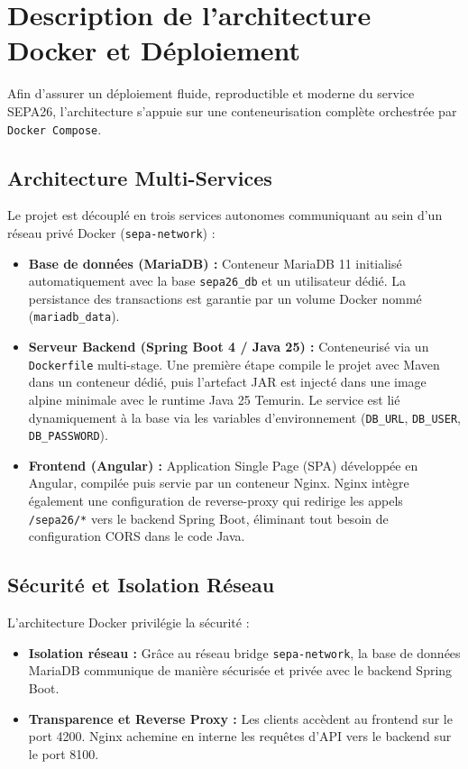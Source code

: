 \documentclass[12pt,a4paper]{article}
\begin{document}
\section{Description de l'architecture Docker et Déploiement}

Afin d'assurer un déploiement fluide, reproductible et moderne du service SEPA26, l'architecture s'appuie sur une conteneurisation complète orchestrée par \texttt{Docker Compose}.

\subsection{Architecture Multi-Services}
Le projet est découplé en trois services autonomes communiquant au sein d'un réseau privé Docker (\texttt{sepa-network}) :

\begin{itemize}
    \item \textbf{Base de données (MariaDB) :} Conteneur MariaDB 11 initialisé automatiquement avec la base \texttt{sepa26\_db} et un utilisateur dédié. La persistance des transactions est garantie par un volume Docker nommé (\texttt{mariadb\_data}).
    \item \textbf{Serveur Backend (Spring Boot 4 / Java 25) :} Conteneurisé via un \texttt{Dockerfile} multi-stage. Une première étape compile le projet avec Maven dans un conteneur dédié, puis l'artefact JAR est injecté dans une image alpine minimale avec le runtime Java 25 Temurin. Le service est lié dynamiquement à la base via les variables d'environnement (\texttt{DB\_URL}, \texttt{DB\_USER}, \texttt{DB\_PASSWORD}).
    \item \textbf{Frontend (Angular) :} Application Single Page (SPA) développée en Angular, compilée puis servie par un conteneur Nginx. Nginx intègre également une configuration de reverse-proxy qui redirige les appels \texttt{/sepa26/*} vers le backend Spring Boot, éliminant tout besoin de configuration CORS dans le code Java.
\end{itemize}

\subsection{Sécurité et Isolation Réseau}
L'architecture Docker privilégie la sécurité :
\begin{itemize}
    \item \textbf{Isolation réseau :} Grâce au réseau bridge \texttt{sepa-network}, la base de données MariaDB communique de manière sécurisée et privée avec le backend Spring Boot.
    \item \textbf{Transparence et Reverse Proxy :} Les clients accèdent au frontend sur le port 4200. Nginx achemine en interne les requêtes d'API vers le backend sur le port 8100.
\end{itemize}
\end{document}
